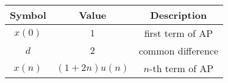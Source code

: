 \begin{tabular}{|c|c|c|}
	\hline
	\textbf{Symbol} & \textbf{Value} & \textbf{Description} \\[6pt]
	\hline
	$x(0)$ & $1$ & first term of AP \\[6pt]
	\hline
	$d$ & $2$ & common difference \\[6pt]
	\hline
	$x(n)$ & $(1+2n)u(n)$ & $n$-th term of AP \\[6pt]
	\hline
\end{tabular}
